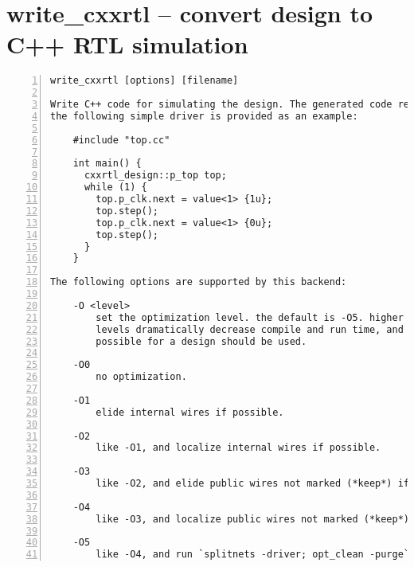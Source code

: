 \section{write\_cxxrtl -- convert design to C++ RTL simulation}
\label{cmd:write_cxxrtl}
\begin{lstlisting}[numbers=left,frame=single]
    write_cxxrtl [options] [filename]

Write C++ code for simulating the design. The generated code requires a driver;
the following simple driver is provided as an example:

    #include "top.cc"

    int main() {
      cxxrtl_design::p_top top;
      while (1) {
        top.p_clk.next = value<1> {1u};
        top.step();
        top.p_clk.next = value<1> {0u};
        top.step();
      }
    }

The following options are supported by this backend:

    -O <level>
        set the optimization level. the default is -O5. higher optimization
        levels dramatically decrease compile and run time, and highest level
        possible for a design should be used.

    -O0
        no optimization.

    -O1
        elide internal wires if possible.

    -O2
        like -O1, and localize internal wires if possible.

    -O3
        like -O2, and elide public wires not marked (*keep*) if possible.

    -O4
        like -O3, and localize public wires not marked (*keep*) if possible.

    -O5
        like -O4, and run `splitnets -driver; opt_clean -purge` first.
\end{lstlisting}

